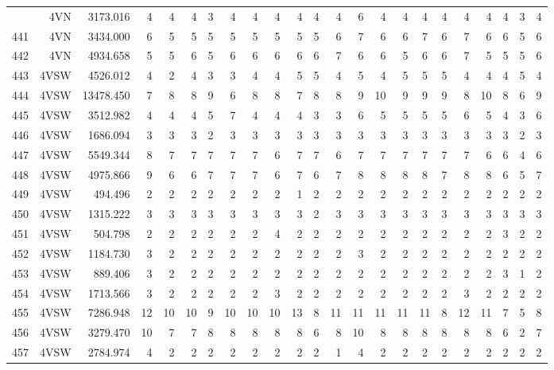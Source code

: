 \documentclass[12pt]{article}\usepackage[]{graphicx}\usepackage[]{color}
\begin{document}
\begin{landscapepage}
\begin{longtable}[t]{crrrrrrrrrrrrrrrcrrrrrr}
\endfoot
\bottomrule
\endlastfoot
440 & 4VN & 3173.016 & 4 & 4 & 4 & 3 & 4 & 4 & 4 & 4 & 4 & 4 & 6 & 4 & 4 & 4 & 4 & 4 & 4 & 4 & 3 & 4\\
441 & 4VN & 3434.000 & 6 & 5 & 5 & 5 & 5 & 5 & 5 & 5 & 5 & 6 & 7 & 6 & 6 & 7 & 6 & 7 & 6 & 6 & 5 & 6\\
442 & 4VN & 4934.658 & 5 & 5 & 6 & 5 & 6 & 6 & 6 & 6 & 6 & 7 & 6 & 6 & 5 & 6 & 6 & 7 & 5 & 5 & 5 & 6\\
443 & 4VSW & 4526.012 & 4 & 2 & 4 & 3 & 3 & 4 & 4 & 5 & 5 & 4 & 5 & 4 & 5 & 5 & 5 & 4 & 4 & 4 & 5 & 4\\
444 & 4VSW & 13478.450 & 7 & 8 & 8 & 9 & 6 & 8 & 8 & 7 & 8 & 8 & 9 & 10 & 9 & 9 & 9 & 8 & 10 & 8 & 6 & 9\\
445 & 4VSW & 3512.982 & 4 & 4 & 4 & 5 & 7 & 4 & 4 & 4 & 3 & 3 & 6 & 5 & 5 & 5 & 5 & 6 & 5 & 4 & 3 & 6\\
446 & 4VSW & 1686.094 & 3 & 3 & 3 & 2 & 3 & 3 & 3 & 3 & 3 & 3 & 3 & 3 & 3 & 3 & 3 & 3 & 3 & 3 & 2 & 3\\
447 & 4VSW & 5549.344 & 8 & 7 & 7 & 7 & 7 & 7 & 6 & 7 & 7 & 6 & 7 & 7 & 7 & 7 & 7 & 7 & 6 & 6 & 4 & 6\\
448 & 4VSW & 4975.866 & 9 & 6 & 6 & 7 & 7 & 7 & 6 & 7 & 6 & 7 & 8 & 8 & 8 & 8 & 7 & 8 & 8 & 6 & 5 & 7\\
449 & 4VSW & 494.496 & 2 & 2 & 2 & 2 & 2 & 2 & 2 & 1 & 2 & 2 & 2 & 2 & 2 & 2 & 2 & 2 & 2 & 2 & 2 & 2\\
450 & 4VSW & 1315.222 & 3 & 3 & 3 & 3 & 3 & 3 & 3 & 3 & 2 & 3 & 3 & 3 & 3 & 3 & 3 & 3 & 3 & 3 & 3 & 3\\
451 & 4VSW & 504.798 & 2 & 2 & 2 & 2 & 2 & 2 & 4 & 2 & 2 & 2 & 2 & 2 & 2 & 2 & 2 & 2 & 2 & 3 & 2 & 2\\
452 & 4VSW & 1184.730 & 3 & 2 & 2 & 2 & 2 & 2 & 2 & 2 & 2 & 2 & 3 & 2 & 2 & 2 & 2 & 2 & 2 & 2 & 2 & 2\\
453 & 4VSW & 889.406 & 3 & 2 & 2 & 2 & 2 & 2 & 2 & 2 & 2 & 2 & 2 & 2 & 2 & 2 & 2 & 2 & 2 & 3 & 1 & 2\\
454 & 4VSW & 1713.566 & 3 & 2 & 2 & 2 & 2 & 2 & 3 & 2 & 2 & 2 & 2 & 2 & 2 & 2 & 2 & 3 & 2 & 2 & 2 & 2\\
455 & 4VSW & 7286.948 & 12 & 10 & 10 & 9 & 10 & 10 & 10 & 13 & 8 & 11 & 11 & 11 & 11 & 11 & 8 & 12 & 11 & 7 & 5 & 8\\
456 & 4VSW & 3279.470 & 10 & 7 & 7 & 8 & 8 & 8 & 8 & 8 & 6 & 8 & 10 & 8 & 8 & 8 & 8 & 8 & 8 & 6 & 2 & 7\\
457 & 4VSW & 2784.974 & 4 & 2 & 2 & 2 & 2 & 2 & 2 & 2 & 2 & 1 & 4 & 2 & 2 & 2 & 2 & 2 & 2 & 2 & 2 & 2\\

\end{longtable}
\end{landscapepage}
\end{document}
